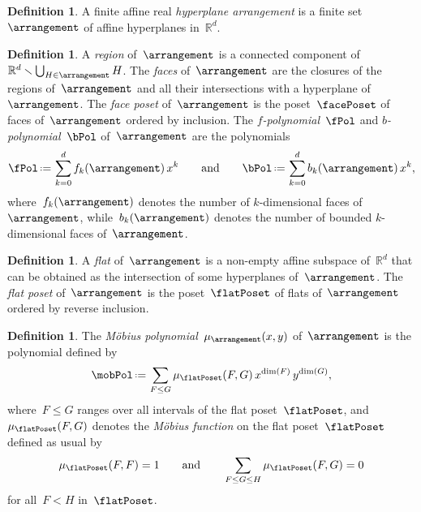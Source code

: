 \documentclass{amsart}
\newcommand{\darkblue}{\color{darkblue}} %
\theoremstyle{definition}
\newtheorem{definition}[theorem]{Definition}
\newcommand{\R}{\mathbb{R}} %
\newcommand{\ssm}{\smallsetminus} %
\newcommand{\eqdef}{\mbox{\,\raisebox{0.2ex}{\scriptsize\ensuremath{\mathrm:}}\ensuremath{=}\,}} %
\newcommand{\defn}[1]{\textsl{\darkblue #1}} %
\begin{document}
\begin{definition}
A finite affine real \defn{hyperplane arrangement} is a finite set~$\arrangement$ of affine hyperplanes in~$\R^d$.
\end{definition}

\begin{definition}
A \defn{region} of~$\arrangement$ is a connected component of~$\R^d \ssm \bigcup_{H \in \arrangement} H$.
The \defn{faces} of~$\arrangement$ are the closures of the regions of~$\arrangement$ and all their intersections with a hyperplane of~$\arrangement$.
The \defn{face poset} of~$\arrangement$ is the poset~$\facePoset$ of faces of~$\arrangement$ ordered by inclusion.
The \defn{$f$-polynomial}~$\fPol$ and \defn{$b$-polynomial}~$\bPol$ of~$\arrangement$ are the polynomials
\[
\fPol \eqdef \sum_{k = 0}^d f_k(\arrangement) \, x^k
\qquad\text{and}\qquad
\bPol \eqdef \sum_{k = 0}^d b_k(\arrangement) \, x^k ,
\]
where~$f_k(\arrangement)$ denotes the number of $k$-dimensional faces of~$\arrangement$, while~$b_k(\arrangement)$ denotes the number of bounded $k$-dimensional faces of~$\arrangement$.
\end{definition}

\begin{definition}
A \defn{flat} of~$\arrangement$ is a non-empty affine subspace of~$\R^d$ that can be obtained as the intersection of some hyperplanes of~$\arrangement$.
The \defn{flat poset} of~$\arrangement$ is the poset~$\flatPoset$ of flats of~$\arrangement$ ordered by reverse inclusion.
\end{definition}

\begin{definition}
\label{def:MobiusPolynomial}
The \defn{M\"obius polynomial}~$\mu_{\arrangement}(x,y)$ of~$\arrangement$ is the polynomial defined by
\[
\mobPol \eqdef \sum_{F \le G} \mu_{\flatPoset}(F,G) \, x^{\dim(F)} \, y^{\dim(G)},
\]
where~$F \le G$ ranges over all intervals of the flat poset~$\flatPoset$, and~$\mu_{\flatPoset}(F,G)$ denotes the \defn{M\"obius function} on the flat poset~$\flatPoset$ defined as usual by
\[
\mu_{\flatPoset}(F, F) = 1
\qquad\text{and}\qquad
\sum_{F \le G \le H} \mu_{\flatPoset}(F,G) = 0
\]
for all~$F < H$ in~$\flatPoset$.
\end{definition}
\end{document}
